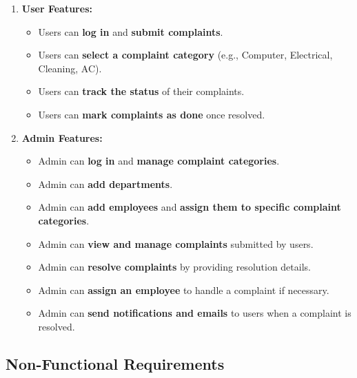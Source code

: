 \documentclass[a4paper,12pt]{article}
\begin{document}
\begin{enumerate}
\item \textbf{User Features:}
\begin{itemize}
\item Users can \textbf{log in} and \textbf{submit complaints}.
\item Users can \textbf{select a complaint category} (e.g., Computer, Electrical, Cleaning, AC).
\item Users can \textbf{track the status} of their complaints.
\item Users can \textbf{mark complaints as done} once resolved.
\end{itemize}
\item \textbf{Admin Features:}
\begin{itemize}
    \item Admin can \textbf{log in} and \textbf{manage complaint categories}.
    \item Admin can \textbf{add departments}.
    \item Admin can \textbf{add employees} and \textbf{assign them to specific complaint categories}.
    \item Admin can \textbf{view and manage complaints} submitted by users.
    \item Admin can \textbf{resolve complaints} by providing resolution details.
    \item Admin can \textbf{assign an employee} to handle a complaint if necessary.
    \item Admin can \textbf{send notifications and emails} to users when a complaint is resolved.
\end{itemize}

\end{enumerate}

\subsection{Non-Functional Requirements}
\end{document}
